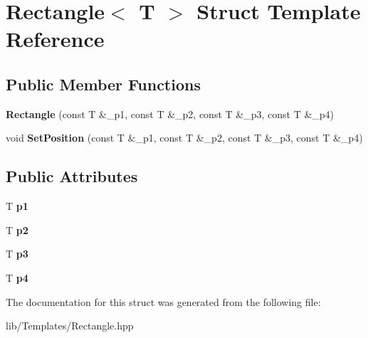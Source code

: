 \hypertarget{struct_rectangle}{}\section{Rectangle$<$ T $>$ Struct Template Reference}
\label{struct_rectangle}
\subsection*{Public Member Functions}
\begin{DoxyCompactItemize}
\item 
\mbox{\label{struct_rectangle_af8e17300c0d03bc93c7e1b5e6e969a80}} 
{\bfseries Rectangle} (const T \&\+\_\+p1, const T \&\+\_\+p2, const T \&\+\_\+p3, const T \&\+\_\+p4)
\item 
\mbox{\label{struct_rectangle_aaefc1e19dacbca8f4672bfe3bd449c98}} 
void {\bfseries Set\+Position} (const T \&\+\_\+p1, const T \&\+\_\+p2, const T \&\+\_\+p3, const T \&\+\_\+p4)
\end{DoxyCompactItemize}
\subsection*{Public Attributes}
\begin{DoxyCompactItemize}
\item 
\mbox{\label{struct_rectangle_aacd2b0c397b8df1e3df2fa93516d7dac}} 
T {\bfseries p1}
\item 
\mbox{\label{struct_rectangle_adb4391197618708e3ee812eadc0a3365}} 
T {\bfseries p2}
\item 
\mbox{\label{struct_rectangle_af056110dc4403bcad6ab43ba679d6d8c}} 
T {\bfseries p3}
\item 
\mbox{\label{struct_rectangle_adb507bf1b5ad378d45fd96e2fc3cd81f}} 
T {\bfseries p4}
\end{DoxyCompactItemize}


The documentation for this struct was generated from the following file\+:\begin{DoxyCompactItemize}
\item 
lib/\+Templates/Rectangle.\+hpp\end{DoxyCompactItemize}
